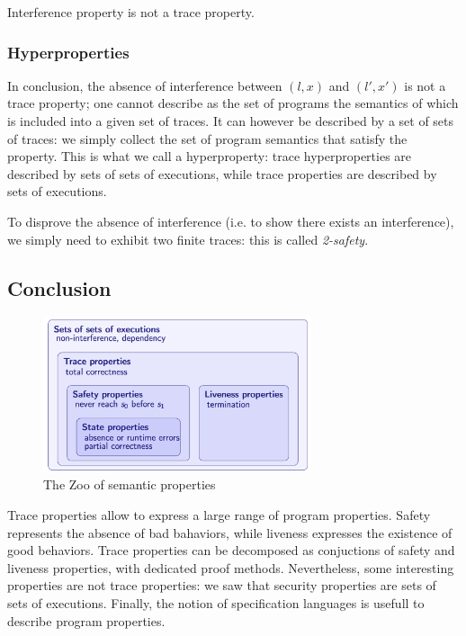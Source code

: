 \documentclass[toc]{../cs-classes/cs-classes}
\begin{document}
\begin{property}
    Interference property is not a trace property.
\end{property}

\subsubsection{Hyperproperties}
In conclusion, the absence of interference between $(l, x)$ and $(l', x')$ is not a trace property; one cannot describe as the set of programs the semantics of which is included into a given set of traces. It can however be described by a set of sets of traces: we simply collect the set of program semantics that satisfy the property. This is what we call a hyperproperty: trace hyperproperties are described by sets of sets of executions, while trace properties are described by sets of executions.

To disprove the absence of interference (i.e. to show there exists an interference), we simply need to exhibit two finite traces: this is called \emph{2-safety}.

\subsection{Conclusion}
\begin{figure}[H]
    \centering
    \includegraphics[width=0.7\textwidth]{images/semantic-properties.png}
    \caption{The Zoo of semantic properties}
\end{figure}

Trace properties allow to express a large range of program properties. Safety represents the absence of bad bahaviors, while liveness expresses the existence of good behaviors. Trace properties can be decomposed as conjuctions of safety and liveness properties, with dedicated proof methods. Nevertheless, some interesting properties are not trace properties: we saw that security properties are sets of sets of executions. Finally, the notion of specification languages is usefull to describe program properties.
\end{document}
